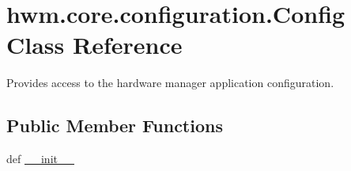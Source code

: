 \hypertarget{classhwm_1_1core_1_1configuration_1_1_config}{\section{hwm.\-core.\-configuration.\-Config Class Reference}
\label{classhwm_1_1core_1_1configuration_1_1_config}
}


Provides access to the hardware manager application configuration.  


\subsection*{Public Member Functions}
\begin{DoxyCompactItemize}
\item 
\hypertarget{classhwm_1_1core_1_1configuration_1_1_config_a06460bf2af249c6601827b2afde8b291}{def \hyperlink{classhwm_1_1core_1_1configuration_1_1_config_a06460bf2af249c6601827b2afde8b291}{\-\_\-\-\_\-init\-\_\-\-\_\-}}\label{classhwm_1_1core_1_1configuration_1_1_config_a06460bf2af249c6601827b2afde8b291}


\end{DoxyCompactItemize}
